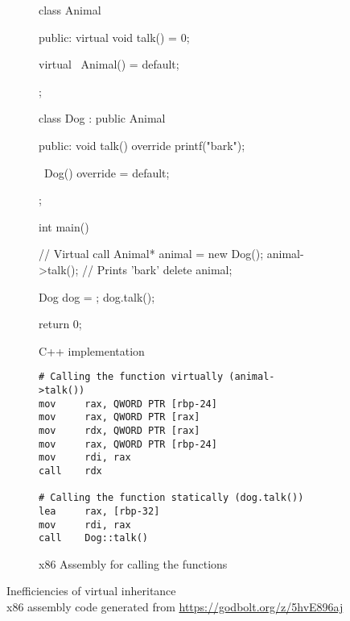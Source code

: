 \begin{figure}[ht]
    \centering
    \begin{subfigure}{0.49\linewidth}%
        \begin{cppcode}
class Animal {
public:
    virtual void talk() = 0;

    virtual ~Animal() = default;
};

class Dog : public Animal {
public:
    void talk() override {
        printf("bark\n");
    }

    ~Dog() override = default;
};

int main() {
    // Virtual call
    Animal* animal = new Dog();
    animal->talk(); // Prints 'bark'
    delete animal;

    Dog dog = {};
    dog.talk();

    return 0;
}
        \end{cppcode}
        \caption{C++ implementation}
    \end{subfigure}%
    \begin{subfigure}{0.49\linewidth}%
        \begin{verbatim}
# Calling the function virtually (animal->talk())
mov     rax, QWORD PTR [rbp-24]
mov     rax, QWORD PTR [rax]
mov     rdx, QWORD PTR [rax]
mov     rax, QWORD PTR [rbp-24]
mov     rdi, rax
call    rdx
        
# Calling the function statically (dog.talk())
lea     rax, [rbp-32]
mov     rdi, rax
call    Dog::talk()
        \end{verbatim}
        \caption{x86 Assembly for calling the functions}
    \end{subfigure}%
    \caption{Inefficiencies of virtual inheritance\\{x86 assembly code generated from \url{https://godbolt.org/z/5hvE896aj}}}
    \label{fig:virtual_inheritance}
\end{figure}